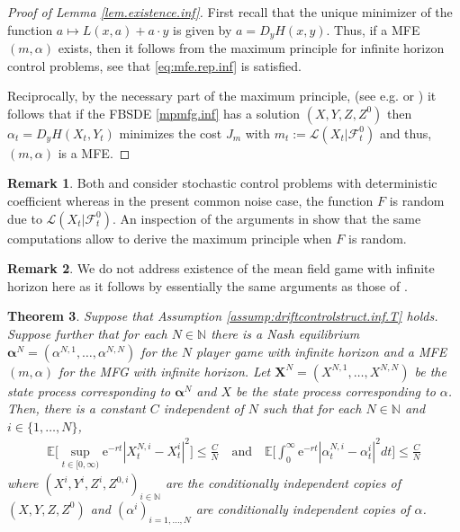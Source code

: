 \documentclass[11pt,reqno]{amsart}
\numberwithin{equation}{section}
\newtheorem{theorem}{Theorem}[section]
\theoremstyle{definition}
\newtheorem{remark}[theorem]{Remark}
\def\E{{\mathbb E}}
\def\N{{\mathbb N}}
\newcommand{\sL}{\mathcal{L}}
\newcommand{\sF}{\mathcal{F}}
\def \E{\mathbb{E}}
\def \N{\mathbb{N}}
\def \e{\mathrm{e}}
\begin{document}
\begin{proof}[Proof of Lemma \ref{lem.existence.inf}]
  First recall that the unique minimizer of the function $a\mapsto L(x,a) + a\cdot y$ is given by $a = D_yH(x,y)$.
  Thus, if a MFE $(m,\alpha)$ exists, then it follows from the maximum principle for infinite horizon control problems, see \cite[Section 3.1]{Bayraktar-zhang23} that \eqref{eq:mfe.rep.inf} is satisfied.

Reciprocally, by the necessary part of the maximum principle,   (see e.g. \cite[Proposition 3.1]{Bayraktar-zhang23} or \cite[Theorem 2]{Maslow-Veverka14}) it follows that if the FBSDE \eqref{mpmfg.inf} has a solution $(X, Y, Z, Z^0)$ then $\alpha_t = D_yH(X_t, Y_t)$ minimizes the cost $J_m$ with $m_t := \sL(X_t|\sF_t^0)$ and thus, $(m,\alpha)$ is a MFE.
\end{proof}
\begin{remark}
  Both \cite{Bayraktar-zhang23} and \cite{Maslow-Veverka14} consider stochastic control problems with deterministic coefficient whereas in the present common noise case, the function $F$ is random due to $\sL(X_t|\sF_t^0)$.
  An inspection of the arguments in \cite[Section 3.1]{Bayraktar-zhang23} show that the same computations allow to derive the maximum principle when $F$ is random.
\end{remark}

\begin{remark}
  We do not address existence of the mean field game with infinite horizon here as it follows by essentially the same arguments as those of \cite[Theorem 2.1]{Bayraktar-zhang23}.
\end{remark}

\begin{theorem}
  \label{thm:conver.inf}
  Suppose that Assumption \ref{assump:driftcontrolstruct.inf.T} holds.
  Suppose further that for each $N\in \N$ there is a Nash equilibrium $\bm\alpha^N = (\alpha^{N,1},\dots, \alpha^{N,N})$ for the $N$ player game with infinite horizon and a MFE $(m,\alpha)$ for the MFG with infinite horizon.
  Let $\bm X^N = (X^{N,1},\dots, X^{N,N})$ be the state process corresponding to $\bm \alpha^N$ and $X$ be the state process corresponding to $\alpha$.
  Then, there is a constant $C$ independent of $N$ such that for each $N\in \N$ and $i\in \{1,\dots,N\}$,
  \begin{align*}
    \E\Big[\sup_{ t\in [0,\infty)}\e^{-rt} |X_t^{N,i} - X_t^i|^2\Big] \leq \frac{C}{N} \quad \mathrm{and}\quad \E\bigg[\int_0^\infty\e^{-rt} |\alpha_t^{N,i} - \alpha_t^{i}|^2 dt \bigg] \leq \frac CN
  \end{align*}
  where $(X^i, Y^i, Z^i, Z^{0,i})_{i \in \N}$ are the conditionally independent copies of $(X, Y, Z, Z^0)$ and $(\alpha^i)_{i=1,\dots, N}$ are conditionally independent copies of $\alpha$. 
\end{theorem}
\end{document}
